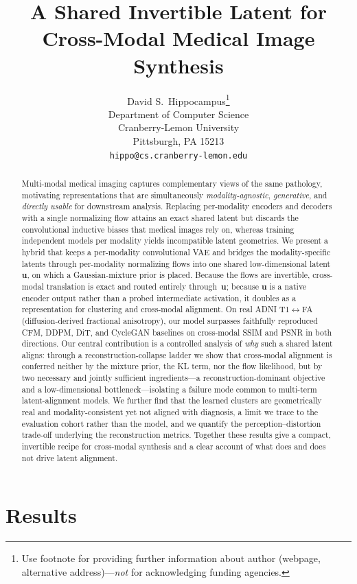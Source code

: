 \documentclass{article}
\title{A Shared Invertible Latent for Cross-Modal Medical Image Synthesis}
\author{%
  David S.~Hippocampus\thanks{Use footnote for providing further information
    about author (webpage, alternative address)---\emph{not} for acknowledging
    funding agencies.} \\
  Department of Computer Science\\
  Cranberry-Lemon University\\
  Pittsburgh, PA 15213 \\
  \texttt{hippo@cs.cranberry-lemon.edu} \\
}
\begin{document}
\maketitle


\begin{abstract}
  Multi-modal medical imaging captures complementary views of the same
  pathology, motivating representations that are simultaneously
  \emph{modality-agnostic}, \emph{generative}, and \emph{directly usable}
  for downstream analysis. Replacing per-modality encoders and decoders with a
  single normalizing flow attains an exact shared latent but discards the
  convolutional inductive biases that medical images rely on, whereas training
  independent models per modality yields incompatible latent geometries. We
  present a hybrid that keeps a per-modality convolutional VAE and bridges the
  modality-specific latents through per-modality normalizing flows into one
  shared low-dimensional latent~$\mathbf{u}$, on which a Gaussian-mixture prior
  is placed. Because the flows are invertible, cross-modal translation is exact
  and routed entirely through~$\mathbf{u}$; because $\mathbf{u}$ is a native
  encoder output rather than a probed intermediate activation, it doubles as a
  representation for clustering and cross-modal alignment. On real ADNI
  T1$\leftrightarrow$FA (diffusion-derived fractional anisotropy), our model
  surpasses faithfully reproduced CFM, DDPM, DiT, and CycleGAN baselines on
  cross-modal SSIM and PSNR in both directions. Our central contribution is a
  controlled analysis of \emph{why} such a shared latent aligns: through a
  reconstruction-collapse ladder we show that cross-modal alignment is conferred
  neither by the mixture prior, the KL term, nor the flow likelihood, but by two
  necessary and jointly sufficient ingredients---a reconstruction-dominant
  objective and a low-dimensional bottleneck---isolating a failure mode common
  to multi-term latent-alignment models. We further find that the learned
  clusters are geometrically real and modality-consistent yet not aligned with
  diagnosis, a limit we trace to the evaluation cohort rather than the model,
  and we quantify the perception--distortion trade-off underlying the
  reconstruction metrics. Together these results give a compact, invertible
  recipe for cross-modal synthesis and a clear account of what does and does not
  drive latent alignment.
\end{abstract}


\section{Results}
\label{sec:results}
\end{document}
